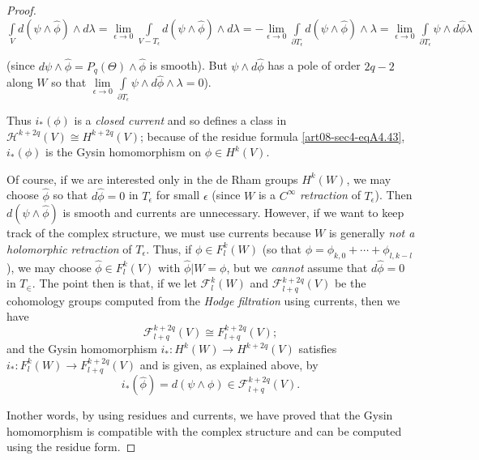 \begin{proof}
$\int\limits_{V}d(\psi\wedge \widehat{\phi})\wedge d\lambda=\lim\limits_{\epsilon\to 0}\int\limits_{V-T_{\epsilon}}d(\psi \wedge \widehat{\phi})\wedge d\lambda=-\lim\limits_{\epsilon\to 0}\int\limits_{\partial T_{\epsilon}}d(\psi\wedge\widehat{\phi})\wedge \lambda=\lim\limits_{\epsilon\to 0}\int\limits_{\partial T_{\epsilon}}\psi\wedge d\widehat{\phi}\lambda$

(since $d\psi\wedge \widehat{\phi}=P_{q}(\Theta)\wedge \widehat{\phi}$ is smooth). But $\psi\wedge d\widehat{\phi}$ has a pole of order $2q-2$ along $W$ so that $\lim\limits_{\epsilon\to 0}\int\limits_{\partial T_{\epsilon}}\psi\wedge d\widehat{\phi}\wedge\lambda=0$).

Thus $i_{*}(\phi)$ is a {\em closed current} and so defines a class in $\mathscr{H}^{k+2q}(V)\cong H^{k+2q}(V)$; because of the residue formula \eqref{art08-sec4-eqA4.43}, $i_{*}(\phi)$ is the Gysin homomorphism on $\phi\in H^{k}(V)$.

Of course, if we are interested only in the de Rham groups $H^{k}(W)$, we may choose $\widehat{\phi}$ so that $d\widehat{\phi}=0$ in $T_{\epsilon}$ for small $\epsilon$ (since $W$ is a $C^{\infty}$ {\em retraction} of $T_{\epsilon}$). Then $d(\psi\wedge \widehat{\phi})$ is smooth and currents are unnecessary. However, if we want to keep track of the complex structure, we must use currents because $W$ is generally {\em not a holomorphic retraction} of $T_{\epsilon}$. Thus, if $\phi\in F^{k}_{l}(W)$ (so that $\phi=\phi_{k,0}+\cdots+\phi_{l,k-l}$), we may choose $\widehat{\phi}\in F^{k}_{l}(V)$ with $\widehat{\phi}|W=\phi$, but we {\em cannot} assume that $d\widehat{\phi}=0$ in $T_{\in}$. The point then is that, if we let $\mathscr{F}^{k}_{l}(W)$ and $\mathscr{F}^{k+2q}_{l+q}(V)$ be the cohomology groups computed from the {\em Hodge filtration} using currents, then we have
\begin{equation*}
\mathscr{F}^{k+2q}_{l+q}(V)\cong F^{k+2q}_{l+q}(V);\tag{A4.46}\label{art08-sec4-eqA4.46}
\end{equation*}
and the Gysin homomorphism $i_{*}:H^{k}(W)\to H^{k+2q}(V)$ satisfies $i_{*}:F^{k}_{l}(W)\to F^{k+2q}_{l+q}(V)$ and is given, as explained above, by
\begin{equation*}
i_{*}(\widehat{\phi})=d(\psi\wedge \phi)\in \mathscr{F}^{k+2q}_{l+q}(V).\tag{A4.47}\label{art08-sec4-eqA4.47}
\end{equation*}

\eject

In\pageoriginale other words, by using residues and currents, we have proved that the Gysin homomorphism is compatible with the complex structure and can be computed using the residue form.
\end{proof}

